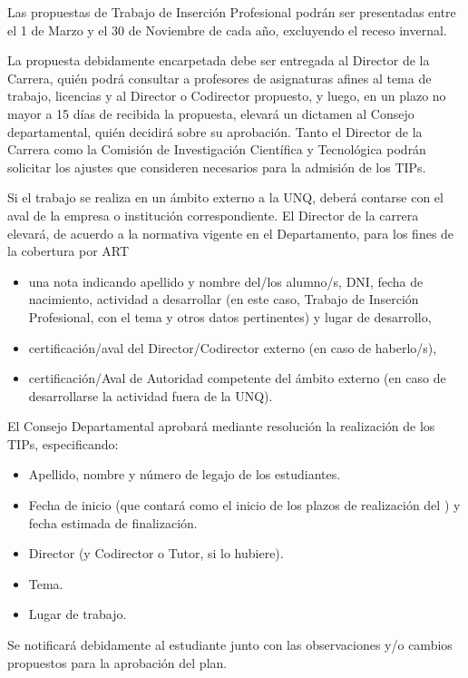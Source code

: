 \articulo Las propuestas de Trabajo de Inserción Profesional podrán ser
presentadas entre el 1 de Marzo y el 30 de Noviembre de cada año, excluyendo el
receso invernal.

\articulo La propuesta debidamente encarpetada debe ser entregada al
Director de la Carrera, quién podrá consultar a profesores de asignaturas afines al
tema de trabajo, licencias y al Director o Codirector propuesto, y luego, en un
plazo no mayor a 15 días de recibida la propuesta, elevará un dictamen al Consejo departamental,
quién decidirá sobre su aprobación. Tanto el Director de la Carrera como la Comisión de Investigación
Científica y Tecnológica podrán solicitar los ajustes que consideren necesarios para la
admisión de los TIPs. 

\articulo Si el trabajo se realiza en un ámbito externo a la UNQ, deberá
contarse con el aval de la empresa o institución correspondiente. El Director de la
carrera elevará, de acuerdo a la normativa vigente en el Departamento, para los fines
de la cobertura por ART

\begin{itemize}
 \item una nota indicando apellido y nombre del/los alumno/s, DNI, fecha
 de nacimiento, actividad a desarrollar (en este caso, Trabajo de
 Inserción Profesional, con el tema y otros datos pertinentes) y lugar
 de desarrollo,
 \item certificación/aval del Director/Codirector externo (en caso de
 haberlo/s),
 \item certificación/Aval de Autoridad competente del ámbito externo (en
 caso de desarrollarse la actividad fuera de la UNQ).
\end{itemize}


\articulo El Consejo Departamental aprobará mediante resolución la
realización de los TIPs, especificando:
\begin{itemize}
 \item Apellido, nombre y número de legajo de los estudiantes.
 \item Fecha de inicio (que contará como el inicio de los plazos de
 realización del \artTiempo) y fecha estimada de finalización.
 \item Director (y Codirector o Tutor, si lo hubiere).
 \item Tema.
 \item Lugar de trabajo.
\end{itemize}

Se notificará debidamente al estudiante junto con las observaciones y/o cambios
propuestos para la aprobación del plan.

